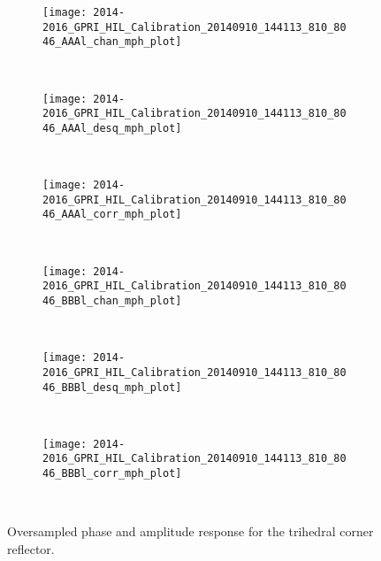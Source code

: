 \begin{figure*}[h]
	\begin{subfigure}[b]{0.6\columnwidth}
		\centering
		\texttt{[image: 2014-2016\_GPRI\_HIL\_Calibration\_20140910\_144113\_810\_8046\_AAAl\_chan\_mph\_plot]}
		\label{fig:tcr_mph:HH_uncorr}
	\end{subfigure}~
	\begin{subfigure}[b]{0.6\columnwidth}
		\centering
		\texttt{[image: 2014-2016\_GPRI\_HIL\_Calibration\_20140910\_144113\_810\_8046\_AAAl\_desq\_mph\_plot]}
		\label{fig:tcr_mph:HH_corr}
	\end{subfigure}~
	\begin{subfigure}[b]{0.6\columnwidth}
		\centering
		\texttt{[image: 2014-2016\_GPRI\_HIL\_Calibration\_20140910\_144113\_810\_8046\_AAAl\_corr\_mph\_plot]}
		\label{fig:tcr_mph:HH_corr_ph}
	\end{subfigure}\\
	\begin{subfigure}[b]{0.6\columnwidth}
		\centering
		\texttt{[image: 2014-2016\_GPRI\_HIL\_Calibration\_20140910\_144113\_810\_8046\_BBBl\_chan\_mph\_plot]}
		\label{fig:tcr_mph:VV_uncorr}
	\end{subfigure}~
	\begin{subfigure}[b]{0.6\columnwidth}
		\centering
		\texttt{[image: 2014-2016\_GPRI\_HIL\_Calibration\_20140910\_144113\_810\_8046\_BBBl\_desq\_mph\_plot]}
		\label{fig:tcr_mph:VV_corr}
	\end{subfigure}~
	\begin{subfigure}[b]{0.6\columnwidth}
		\centering
		\texttt{[image: 2014-2016\_GPRI\_HIL\_Calibration\_20140910\_144113\_810\_8046\_BBBl\_corr\_mph\_plot]}
		\label{fig:tcr_mph:VV_corr_ph}
	\end{subfigure}~

	\caption{Oversampled phase and amplitude response for the trihedral corner reflector.}
	\label{fig:tcr_mph}
\end{figure*}
